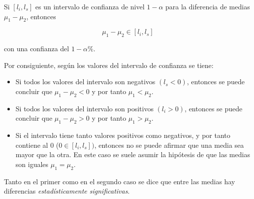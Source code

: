 \documentclass[
  spanish,
  a4paper,
]{scrreport}
\providecommand{\tightlist}{%
  \setlength{\itemsep}{0pt}\setlength{\parskip}{0pt}}
\theoremstyle{plain}
\theoremstyle{definition}
\theoremstyle{definition}
\theoremstyle{remark}
\begin{document}
Si \([l_i,l_s]\) es un intervalo de confianza de nivel \(1-\alpha\) para
la diferencia de medias \(\mu_1-\mu_2\), entonces

\[
\mu_1-\mu_2 \in [l_i,l_s]
\]

con una confianza del \(1-\alpha\%\).

Por consiguiente, según los valores del intervalo de confianza se tiene:

\begin{itemize}
\tightlist
\item
  Si todos los valores del intervalo son negativos \((l_s<0)\), entonces
  se puede concluir que \(\mu_1-\mu_2<0\) y por tanto \(\mu_1<\mu_2\).
\item
  Si todos los valores del intervalo son positivos \((l_i>0)\), entonces
  se puede concluir que \(\mu_1-\mu_2>0\) y por tanto \(\mu_1>\mu_2\).
\item
  Si el intervalo tiene tanto valores positivos como negativos, y por
  tanto contiene al 0 (\(0\in [l_i,l_s])\), entonces no se puede afirmar
  que una media sea mayor que la otra. En este caso se suele asumir la
  hipótesis de que las medias son iguales \(\mu_1=\mu_2\).
\end{itemize}

Tanto en el primer como en el segundo caso se dice que entre las medias
hay diferencias \emph{estadísticamente significativas}.
\end{document}
